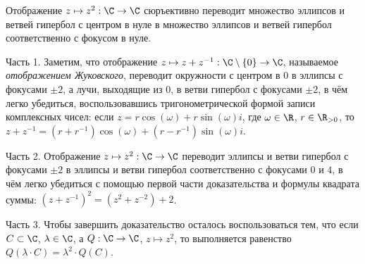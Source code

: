 \documentclass[
	extrafontsizes,
	11pt,
	hyphens,
]{memoir}
\begin{document}

\begin{theorem}
Отображение \(z \mapsto z^2 : \C \to \C\) сюръективно переводит множество эллипсов и ветвей гипербол с центром в нуле в множество эллипсов и ветвей гипербол соответственно с фокусом в нуле.
\end{theorem}

\begin{proofparts}

\item[Часть 1.]
Заметим, что отображение
\(z \mapsto z + z^{-1} : \C \setminus \{0\} \to \C\),
называемое \emph{отображением Жуковского},
переводит окружности с центром в \(0\) в эллипсы с фокусами \(\pm 2\),
а лучи, выходящие из \(0\), в ветви гипербол с фокусами \(\pm 2\),
в чём легко убедиться, воспользовавшись тригонометрической формой записи комплексных чисел:
если
\(z = r \cos(\omega) + r \sin(\omega) i\),
где \(\omega \in \R\), \(r \in \R_{>0}\),
то
\(z + z^{-1} = (r + r^{-1}) \cos(\omega) + (r - r^{-1}) \sin(\omega) i\).

\item[Часть 2.]
Отображение \(z \mapsto z^2 : \C \to \C\) переводит эллипсы и ветви гипербол с фокусами \(\pm 2\) в эллипсы и ветви гипербол соответственно с фокусами \(0\) и \(4\),
в чём легко убедиться с помощью первой части доказательства и формулы квадрата суммы: \((z + z^{-1})^2 = (z^2 + z^{-2}) + 2\).

\item[Часть 3.]
Чтобы завершить доказательство осталось воспользоваться тем, что если \(C \subset \C\), \(\lambda \in \C\),
а \(Q : \C \to \C\), \(z \mapsto z^2\), то выполняется равенство \(Q(\lambda \cdot C) = \lambda^2 \cdot Q(C)\).
\qedhere


\end{proofparts}
\end{document}
